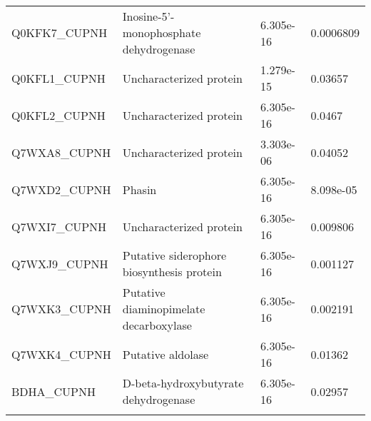 \begin{center}
\begin{longtable}{ l l l l }
Q0KFK7\_CUPNH & Inosine-5'-monophosphate dehydrogenase& 6.305e-16 & 0.0006809 \\ [0.5ex]
Q0KFL1\_CUPNH & Uncharacterized protein& 1.279e-15 & 0.03657 \\ [0.5ex]
Q0KFL2\_CUPNH & Uncharacterized protein& 6.305e-16 & 0.0467 \\ [0.5ex]
Q7WXA8\_CUPNH & Uncharacterized protein& 3.303e-06 & 0.04052 \\ [0.5ex]
Q7WXD2\_CUPNH & Phasin& 6.305e-16 & 8.098e-05 \\ [0.5ex]
Q7WXI7\_CUPNH & Uncharacterized protein& 6.305e-16 & 0.009806 \\ [0.5ex]
Q7WXJ9\_CUPNH & Putative siderophore biosynthesis protein& 6.305e-16 & 0.001127 \\ [0.5ex]
Q7WXK3\_CUPNH & Putative diaminopimelate decarboxylase& 6.305e-16 & 0.002191 \\ [0.5ex]
Q7WXK4\_CUPNH & Putative aldolase& 6.305e-16 & 0.01362 \\ [0.5ex]
BDHA\_CUPNH & D-beta-hydroxybutyrate dehydrogenase& 6.305e-16 & 0.02957 \\ [0.5ex] \bottomrule
\label{table:ralstonia-proteins}
\end{longtable}
\end{center}
